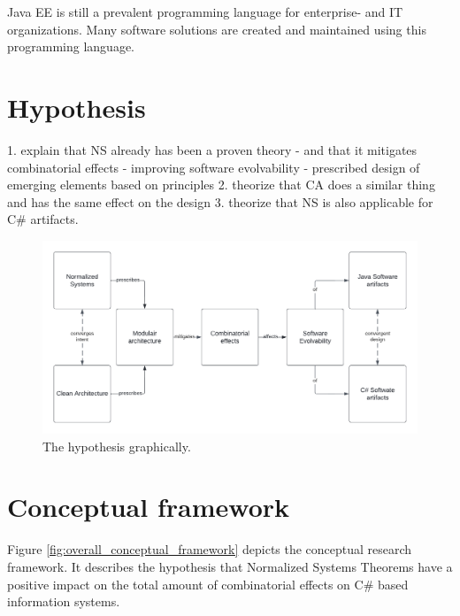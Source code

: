 Java EE is still a prevalent programming language for enterprise- and IT organizations.
Many software solutions are created and maintained using this programming language.

\section{Hypothesis} \label{hypothesis}
1. explain that NS already has been a proven theory
    - and that it mitigates combinatorial effects
    - improving software evolvability
    - prescribed design of emerging elements based on principles
2. theorize that CA does a similar thing and has the same effect on the design
3. theorize that NS is also applicable for C\# artifacts.

\begin{figure}[!h]
    \centering
    \includegraphics[width=1\textwidth]{Figures/hypothesis.pdf}
    \caption[The hypothesis graphically.]{The hypothesis graphically.}
    \label{fig:hypothesis}
\end{figure}

\section{Conceptual framework} \label{conceptual_framework}
Figure \ref{fig:overall_conceptual_framework} depicts the conceptual research framework.
It describes the hypothesis that Normalized Systems Theorems have a positive impact on the
total amount of combinatorial effects on C\# based information systems.

